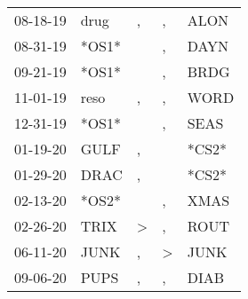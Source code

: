 \begin{supertabular}{p{0.07\textwidth}p{0.06\textwidth}p{0.02\textwidth}p{0.02\textwidth}p{0.06\textwidth}}
          08-18-19\textsuperscript{} &           drug\textsuperscript{} &                , &                , &           ALON\textsuperscript{} \\
          08-31-19\textsuperscript{} &                            *OS1* &                  &                , &           DAYN\textsuperscript{} \\
          09-21-19\textsuperscript{} &                            *OS1* &                  &                , &           BRDG\textsuperscript{} \\
          11-01-19\textsuperscript{} &           reso\textsuperscript{} &                , &                , &           WORD\textsuperscript{} \\
          12-31-19\textsuperscript{} &                            *OS1* &                  &                , &           SEAS\textsuperscript{} \\
          01-19-20\textsuperscript{} &           GULF\textsuperscript{} &                , &                  &                            *CS2* \\
          01-29-20\textsuperscript{} &           DRAC\textsuperscript{} &                , &                  &                            *CS2* \\
          02-13-20\textsuperscript{} &                            *OS2* &                  &                , &           XMAS\textsuperscript{} \\
          02-26-20\textsuperscript{} &           TRIX\textsuperscript{} &     \textgreater &                , &           ROUT\textsuperscript{} \\
          06-11-20\textsuperscript{} &           JUNK\textsuperscript{} &                , &     \textgreater &           JUNK\textsuperscript{} \\
          09-06-20\textsuperscript{} &           PUPS\textsuperscript{} &                , &                , &           DIAB\textsuperscript{} \\
\end{supertabular}
